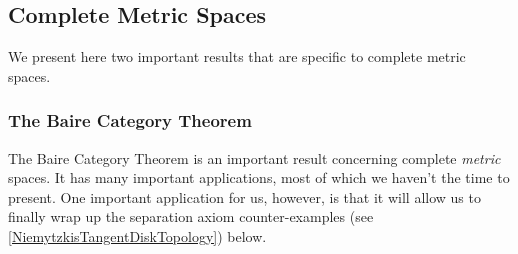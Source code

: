 \subsection{Complete Metric Spaces}

We present here two important results that are specific to complete metric spaces.

\subsubsection{The Baire Category Theorem}

The Baire Category Theorem is an important result concerning complete \emph{metric} spaces.  It has many important applications, most of which we haven't the time to present.  One important application for us, however, is that it will allow us to finally wrap up the separation axiom counter-examples (see \cref{NiemytzkisTangentDiskTopology}) below.

